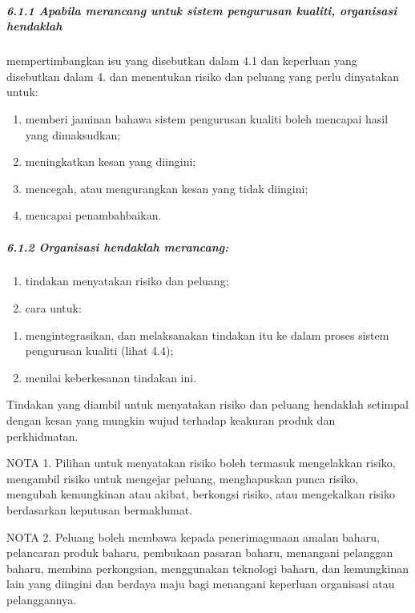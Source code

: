 \documentclass[
]{article}
\begin{document}
\hypertarget{apabila-merancang-untuk-sistem-pengurusan-kualiti-organisasi-hendaklah}{%
\subparagraph{6.1.1 Apabila merancang untuk sistem pengurusan kualiti,
organisasi
hendaklah}\label{apabila-merancang-untuk-sistem-pengurusan-kualiti-organisasi-hendaklah}}

mempertimbangkan isu yang disebutkan dalam 4.1 dan keperluan yang
disebutkan dalam 4. dan menentukan risiko dan peluang yang perlu
dinyatakan untuk:

\begin{enumerate}
\def\labelenumi{\alph{enumi})}
\item
  memberi jaminan bahawa sistem pengurusan kualiti boleh mencapai hasil
  yang dimaksudkan;
\item
  meningkatkan kesan yang diingini;
\item
  mencegah, atau mengurangkan kesan yang tidak diingini;
\item
  mencapai penambahbaikan.
\end{enumerate}

\hypertarget{organisasi-hendaklah-merancang}{%
\subparagraph{6.1.2 Organisasi hendaklah
merancang:}\label{organisasi-hendaklah-merancang}}

\begin{enumerate}
\def\labelenumi{\alph{enumi})}
\item
  tindakan menyatakan risiko dan peluang;
\item
  cara untuk:
\end{enumerate}

\begin{enumerate}
\def\labelenumi{\arabic{enumi})}
\item
  mengintegrasikan, dan melaksanakan tindakan itu ke dalam proses sistem
  pengurusan kualiti (lihat 4.4);
\item
  menilai keberkesanan tindakan ini.
\end{enumerate}

Tindakan yang diambil untuk menyatakan risiko dan peluang hendaklah
setimpal dengan kesan yang mungkin wujud terhadap keakuran produk dan
perkhidmatan.

NOTA 1. Pilihan untuk menyatakan risiko boleh termasuk mengelakkan
risiko, mengambil risiko untuk mengejar peluang, menghapuskan punca
risiko, mengubah kemungkinan atau akibat, berkongsi risiko, atau
mengekalkan risiko berdasarkan keputusan bermaklumat.

NOTA 2. Peluang boleh membawa kepada penerimagunaan amalan baharu,
pelancaran produk baharu, pembukaan pasaran baharu, menangani pelanggan
baharu, membina perkongsian, menggunakan teknologi baharu, dan
kemungkinan lain yang diingini dan berdaya maju bagi menangani keperluan
organisasi atau pelanggannya.
\end{document}
